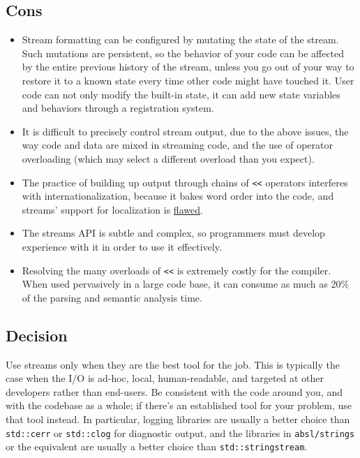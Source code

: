 \subsection{Cons}
\begin{itemize}
    \item Stream formatting can be configured by mutating the state of the stream. Such mutations are persistent, so the behavior of your code can be affected by the entire previous history of the stream, unless you go out of your way to restore it to a known state every time other code might have touched it. User code can not only modify the built-in state, it can add new state variables and behaviors through a registration system.
    \item It is difficult to precisely control stream output, due to the above issues, the way code and data are mixed in streaming code, and the use of operator overloading (which may select a different overload than you expect).
    \item The practice of building up output through chains of \texttt{<<} operators interferes with internationalization, because it bakes word order into the code, and streams' support for localization is \href{http://www.boost.org/doc/libs/1_48_0/libs/locale/doc/html/rationale.html#rationale_why}{flawed}.
    \item The streams API is subtle and complex, so programmers must develop experience with it in order to use it effectively.
    \item Resolving the many overloads of \texttt{<<} is extremely costly for the compiler. When used pervasively in a large code base, it can consume as much as 20\% of the parsing and semantic analysis time.
\end{itemize}

\subsection{Decision}
Use streams only when they are the best tool for the job. This is typically the case when the I/O is ad-hoc, local, human-readable, and targeted at other developers rather than end-users. Be consistent with the code around you, and with the codebase as a whole; if there's an established tool for your problem, use that tool instead. In particular, logging libraries are usually a better choice than \texttt{std::cerr} or \texttt{std::clog} for diagnostic output, and the libraries in \texttt{absl/strings} or the equivalent are usually a better choice than \texttt{std::stringstream}.

